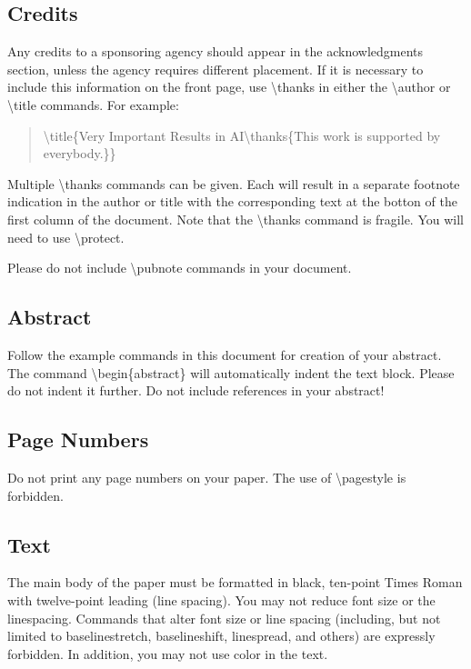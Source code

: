 \subsection{Credits}
Any credits to a sponsoring agency should appear in the acknowledgments section, unless the agency requires different placement. If it is necessary to include this information on the front page, use
\textbackslash thanks in either the \textbackslash author or \textbackslash title commands.
For example:
\begin{quote}
\begin{small}
\textbackslash title\{Very Important Results in AI\textbackslash thanks\{This work is
 supported by everybody.\}\}
\end{small}
\end{quote}
Multiple \textbackslash thanks commands can be given. Each will result in a separate footnote indication in the author or title with the corresponding text at the botton of the first column of the document. Note that the \textbackslash thanks command is fragile. You will need to use \textbackslash protect.

Please do not include \textbackslash pubnote commands in your document.

\subsection{Abstract}
Follow the example commands in this document for creation of your abstract. The command \textbackslash begin\{abstract\} will automatically indent the text block. Please do not indent it further. {Do not include references in your abstract!}

\subsection{Page Numbers}

Do not print any page numbers on your paper. The use of \textbackslash pagestyle is forbidden.

\subsection{Text}
The main body of the paper must be formatted in black, ten-point Times Roman with twelve-point leading (line spacing). You may not reduce font size or the linespacing. Commands that alter font size or line spacing (including, but not limited to baselinestretch, baselineshift, linespread, and others) are expressly forbidden. In addition, you may not use color in the text.

